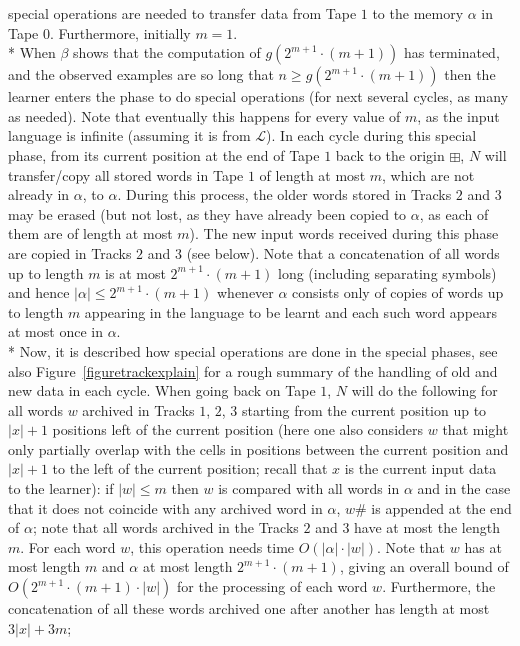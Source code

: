 \documentclass{LMCS}
\newcommand{\CalL}{{\mathcal L}}
\theoremstyle{plain}\newtheorem{athm}[thm]{Theorem}
\theoremstyle{plain}\newtheorem{aprop}[thm]{Proposition}
\theoremstyle{plain}\newtheorem{aprob}[thm]{Open Problem}
\theoremstyle{plain}\newtheorem{acor}[thm]{Corollary}
\theoremstyle{plain}\newtheorem{alem}[thm]{Lemma}
\theoremstyle{definition}\newtheorem{adefn}[thm]{Definition}
\theoremstyle{definition}\newtheorem{arem}[thm]{Remark}
\theoremstyle{plain}\newtheorem{aexmp}[thm]{Example}
\theoremstyle{plain}\newtheorem{aclm}[thm]{Claim}
\def\sp{\\*\indent}
\begin{document}
special operations are needed to transfer data from Tape $1$ to the memory
$\alpha$ in Tape $0$. Furthermore, initially $m=1$. 
\sp
When $\beta$ shows that the computation of
$g(2^{m+1} \cdot (m+1))$ has terminated, and the observed examples
are so long that $n \geq g(2^{m+1} \cdot (m+1))$ then the learner enters
the phase to do special operations (for next several cycles, as many as needed).
Note that eventually this happens for every value of $m$, as the input
language is infinite (assuming it is from $\CalL$).
In each cycle during this special phase, 
from its current position at the end of Tape $1$ back
to the origin $\boxplus$, $N$ will transfer/copy all stored words in 
Tape $1$ of length at most
$m$, which are not already in $\alpha$, to $\alpha$.
During this process, the older words stored in Tracks $2$ and $3$ may be 
erased (but not lost, as they have already been copied to $\alpha$, as each
of them are of length at most $m$). The new input words received during
this phase are copied in Tracks $2$ and $3$ (see below).
Note that a concatenation of
all words up to length $m$ is at most $2^{m+1} \cdot (m+1)$ long (including
separating symbols) and hence $|\alpha| \leq 2^{m+1} \cdot (m+1)$ whenever
$\alpha$ consists only of copies of words up to length $m$ appearing in the
language to be learnt and each such word appears at most once in $\alpha$.
\sp
Now, it is described how special operations are done in the special phases,
see also Figure~\ref{figuretrackexplain} for a rough summary of the
handling of old and new data in each cycle.
When going back on Tape $1$, $N$ will do the following for all words 
$w$ archived in Tracks $1$, $2$, $3$ starting from the current position up to 
$|x|+1$ positions left of the current position (here 
one also considers $w$ that might only partially
overlap with the cells in positions between the current position and
$|x|+1$ to the left of the current position; recall that $x$ is the current
input data to the learner): 
if $|w| \leq m$ then $w$ is compared
with all words in $\alpha$ and in the case that it does not coincide with
any archived word in $\alpha$, $w\#$ is appended at the end of
$\alpha$; note that
all words archived in the Tracks $2$ and $3$ have at most the length $m$.
For each word $w$, this operation needs time $O(|\alpha| \cdot |w|)$.
Note that $w$ has at most length $m$ and $\alpha$ at most length
$2^{m+1} \cdot (m+1)$, giving an overall bound of
$O(2^{m+1} \cdot (m+1) \cdot |w|)$ for the processing of each word $w$.
Furthermore, the concatenation
of all these words archived one after another has length at most $3|x|+3m$;
\end{document}

